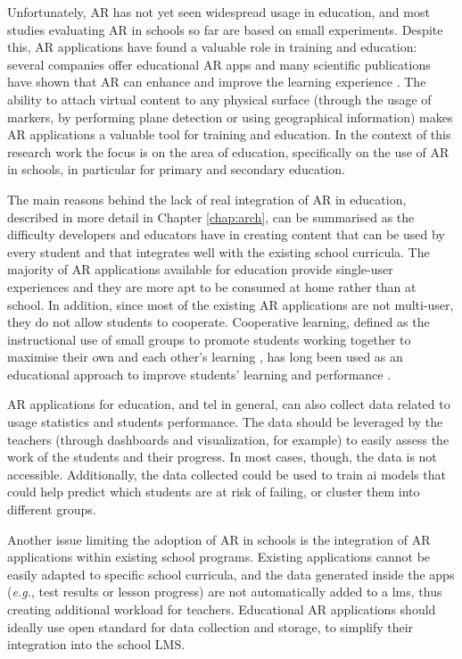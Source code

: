 Unfortunately, AR has not yet seen widespread usage in education, and most studies evaluating AR in schools so far are based on small experiments. Despite this, AR applications have found a valuable role in training and education: several companies offer educational AR apps and many scientific publications have shown that AR can enhance and improve the learning experience \citep{akccayir2017advantages, khan2019impact, garzon2019systematic, GARZON2019244, GARZON2020100334, buchner2022impact, christopoulos2022effects, SAHIN2020103710, Kristoffer2021, huang2016animating, THEODOROPOULOS2021100335}. The ability to attach virtual content to any physical surface (through the usage of markers, by performing plane detection or using geographical information) makes AR applications a valuable tool for training and education. In the context of this research work the focus is on the area of education, specifically on the use of AR in schools, in particular for primary and secondary education.

The main reasons behind the lack of real integration of AR in education, described in more detail in Chapter \ref{chap:arch}, can be summarised as the difficulty developers and educators have in creating content that can be used by every student and that integrates well with the existing school curricula. The majority of AR applications available for education provide single-user experiences and they are more apt to be consumed at home rather than at school. In addition, since most of the existing AR applications are not multi-user, they do not allow students to cooperate. Cooperative learning, defined as the instructional use of small groups to promote students working together to maximise their own and each other's learning \citep{johnson1991cooperation}, has long been used as an educational approach to improve students' learning and performance \citep{Johnson19, kuh2011piecing}.

AR applications for education, and \gls{tel} in general, can also collect data related to usage statistics and students performance. The data should be leveraged by the teachers (through dashboards and visualization, for example) to easily assess the work of the students and their progress. In most cases, though, the data is not accessible. Additionally, the data collected could be used to train \gls{ai} models that could help predict which students are at risk of failing, or cluster them into different groups.

Another issue limiting the adoption of AR in schools is the integration of AR applications within existing school programs. Existing applications cannot be easily adapted to specific school curricula, and the data generated inside the apps (\textit{e.g.}, test results or lesson progress) are not automatically added to a \gls{lms}, thus creating additional workload for teachers. Educational AR applications should ideally use open standard for data collection and storage, to simplify their integration into the school LMS.

